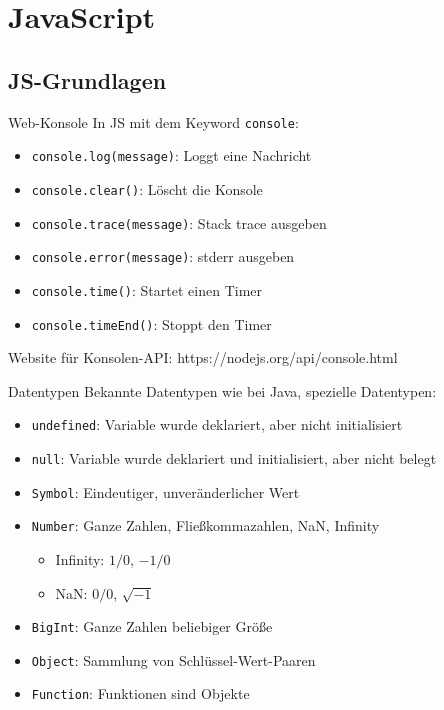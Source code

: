 \section{JavaScript}

\subsection{JS-Grundlagen}
\begin{code}{Web-Konsole}
    In JS mit dem Keyword \texttt{console}:
    \begin{itemize}
        \item \texttt{console.log(message)}: Loggt eine Nachricht
        \item \texttt{console.clear()}: Löscht die Konsole
        \item \texttt{console.trace(message)}: Stack trace ausgeben
        \item \texttt{console.error(message)}: stderr ausgeben
        \item \texttt{console.time()}: Startet einen Timer
        \item \texttt{console.timeEnd()}: Stoppt den Timer
    \end{itemize}
    Website für Konsolen-API: https://nodejs.org/api/console.html
\end{code}

\begin{definition}{Datentypen}
    Bekannte Datentypen wie bei Java, spezielle Datentypen:
    \begin{itemize}
        \item \texttt{undefined}: Variable wurde deklariert, aber nicht initialisiert
        \item \texttt{null}: Variable wurde deklariert und initialisiert, aber nicht belegt
        \item \texttt{Symbol}: Eindeutiger, unveränderlicher Wert
        \item \texttt{Number}: Ganze Zahlen, Fließkommazahlen, NaN, Infinity
        \begin{itemize}
            \item Infinity: $1/0$, $-1/0$
            \item NaN: $0/0$, $\sqrt{-1}$
        \end{itemize}
        \item \texttt{BigInt}: Ganze Zahlen beliebiger Größe
        \item \texttt{Object}: Sammlung von Schlüssel-Wert-Paaren
        \item \texttt{Function}: Funktionen sind Objekte
    \end{itemize}
\end{definition}

